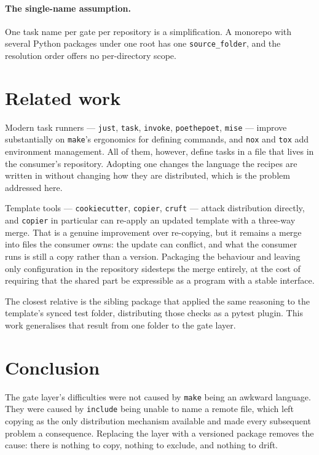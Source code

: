 \documentclass[11pt,a4paper]{article}
\begin{document}
\paragraph{The single-name assumption.} One task name per gate per repository is a
simplification. A monorepo with several Python packages under one root has one
\texttt{source\_folder}, and the resolution order offers no per-directory scope.

\section{Related work}

Modern task runners --- \texttt{just}, \texttt{task}, \texttt{invoke},
\texttt{poethepoet}, \texttt{mise} --- improve substantially on \texttt{make}'s ergonomics
for defining commands, and \texttt{nox} and \texttt{tox} add environment management. All of
them, however, define tasks in a file that lives in the consumer's repository. Adopting one
changes the language the recipes are written in without changing how they are distributed,
which is the problem addressed here.

Template tools --- \texttt{cookiecutter}, \texttt{copier}, \texttt{cruft} --- attack
distribution directly, and \texttt{copier} in particular can re-apply an updated template
with a three-way merge. That is a genuine improvement over re-copying, but it remains a
merge into files the consumer owns: the update can conflict, and what the consumer runs is
still a copy rather than a version. Packaging the behaviour and leaving only configuration
in the repository sidesteps the merge entirely, at the cost of requiring that the shared
part be expressible as a program with a stable interface.

The closest relative is the sibling package that applied the same reasoning to the
template's synced test folder, distributing those checks as a pytest plugin. This work
generalises that result from one folder to the gate layer.

\section{Conclusion}

The gate layer's difficulties were not caused by \texttt{make} being an awkward language.
They were caused by \texttt{include} being unable to name a remote file, which left copying
as the only distribution mechanism available and made every subsequent problem a
consequence. Replacing the layer with a versioned package removes the cause: there is
nothing to copy, nothing to exclude, and nothing to drift.
\end{document}
